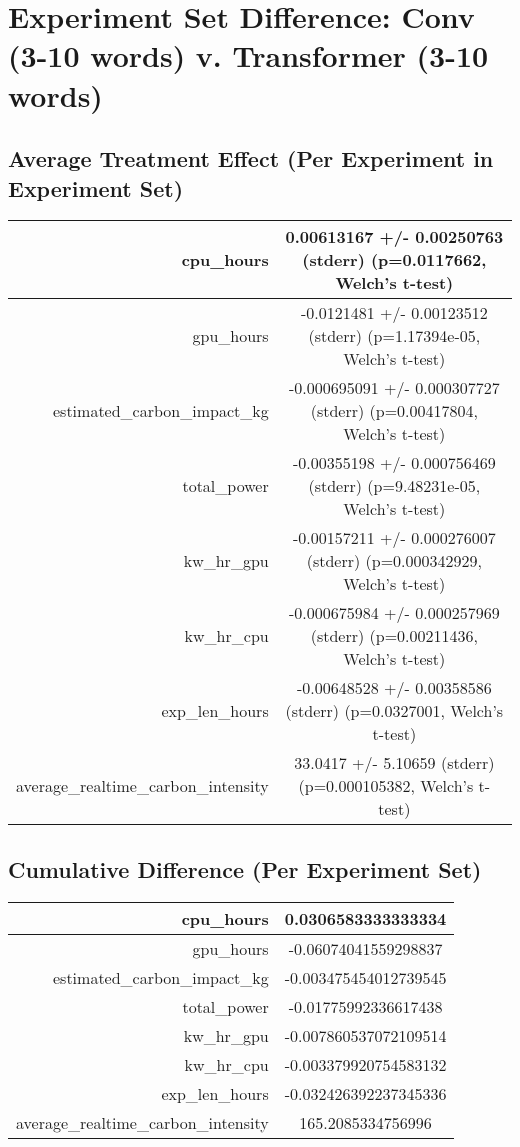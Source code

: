 \documentclass{article}%
\begin{document}
%
\normalsize%
\section{Experiment Set Difference: Conv (3{-}10 words) v. Transformer (3{-}10 words)}%
\label{sec:Experiment Set Difference Conv (3{-}10 words) v. Transformer (3{-}10 words)}%
\subsection{Average Treatment Effect (Per Experiment in Experiment Set)}%
\label{subsec:Average Treatment Effect (Per Experiment in Experiment Set)}%
\begin{tabular}{|r|c|}%
\hline%
cpu\_hours&0.00613167 +/{-} 0.00250763 (stderr) (p=0.0117662, Welch's t{-}test)\\%
\hline%
gpu\_hours&{-}0.0121481 +/{-} 0.00123512 (stderr) (p=1.17394e{-}05, Welch's t{-}test)\\%
\hline%
estimated\_carbon\_impact\_kg&{-}0.000695091 +/{-} 0.000307727 (stderr) (p=0.00417804, Welch's t{-}test)\\%
\hline%
total\_power&{-}0.00355198 +/{-} 0.000756469 (stderr) (p=9.48231e{-}05, Welch's t{-}test)\\%
\hline%
kw\_hr\_gpu&{-}0.00157211 +/{-} 0.000276007 (stderr) (p=0.000342929, Welch's t{-}test)\\%
\hline%
kw\_hr\_cpu&{-}0.000675984 +/{-} 0.000257969 (stderr) (p=0.00211436, Welch's t{-}test)\\%
\hline%
exp\_len\_hours&{-}0.00648528 +/{-} 0.00358586 (stderr) (p=0.0327001, Welch's t{-}test)\\%
\hline%
average\_realtime\_carbon\_intensity&33.0417 +/{-} 5.10659 (stderr) (p=0.000105382, Welch's t{-}test)\\%
\hline%
\end{tabular}

%
\subsection{Cumulative Difference (Per Experiment Set)}%
\label{subsec:Cumulative Difference (Per Experiment Set)}%
\begin{tabular}{|r|c|}%
\hline%
cpu\_hours&0.0306583333333334\\%
\hline%
gpu\_hours&{-}0.06074041559298837\\%
\hline%
estimated\_carbon\_impact\_kg&{-}0.003475454012739545\\%
\hline%
total\_power&{-}0.01775992336617438\\%
\hline%
kw\_hr\_gpu&{-}0.007860537072109514\\%
\hline%
kw\_hr\_cpu&{-}0.003379920754583132\\%
\hline%
exp\_len\_hours&{-}0.032426392237345336\\%
\hline%
average\_realtime\_carbon\_intensity&165.2085334756996\\%
\hline%
\end{tabular}

%
\end{document}

